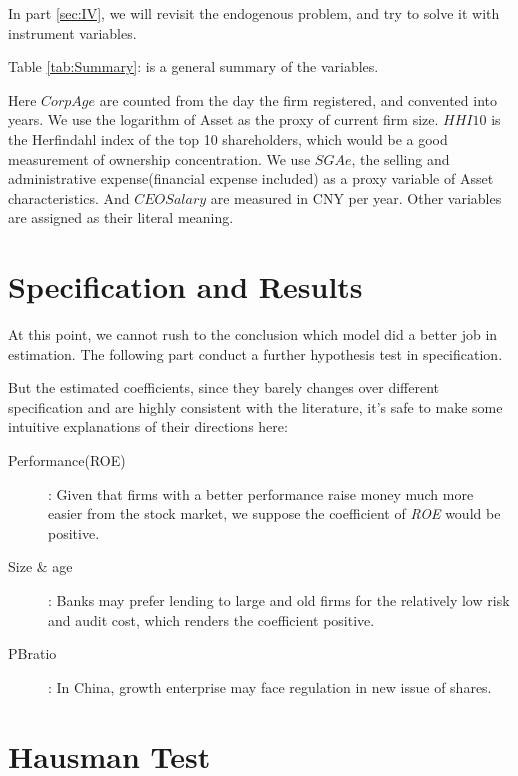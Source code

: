 \documentclass{article}
\begin{document}
In part \ref{sec:IV}, we will revisit the endogenous problem, and try to solve it with instrument variables.

Table \ref{tab:Summary}:  is a general summary of the variables.


Here $CorpAge$ are counted from the day the firm registered, and convented into years. We use the logarithm of Asset as the proxy of current firm size. $HHI10$ is the Herfindahl index of the top 10 shareholders, which would be a good measurement of ownership concentration. We use $SGAe$, the selling and administrative expense(financial expense included) as a proxy variable of Asset characteristics. And $CEO Salary$ are measured in CNY per year. Other variables are assigned as their literal meaning. 
\newpage
\section{Specification and Results} \label{sec:model}

At this point, we cannot rush to the conclusion which model did a better job in estimation. The following part conduct a further hypothesis test in specification.

But the estimated coefficients, since they barely changes over different specification and are highly consistent with the literature, it's safe to make some intuitive explanations of their directions here:
\begin{description}
\item [Performance(ROE)]: Given that firms with a better performance raise money much more easier from the stock market, we suppose the coefficient of {\it ROE} would be positive. 
\item [Size \& age]: Banks may prefer lending to large and old firms for the relatively low risk and audit cost, which renders the coefficient positive.
\item [PBratio]: In China, growth enterprise may face regulation in new issue of shares.
\end{description}

\newpage
\section{Hausman Test}\label{sec:test}
\end{document}
